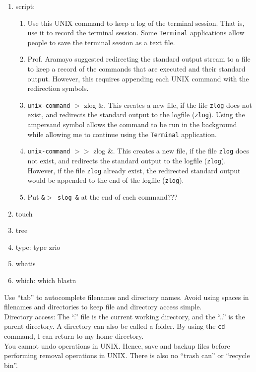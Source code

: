 \begin{enumerate}
\item script: \vspace{-0.3cm}
	\begin{enumerate} \itemsep -2pt
	\item Use this UNIX command to keep a log of the terminal session. That is, use it to record the terminal session. Some {\tt Terminal} applications allow people to save the terminal session as a text file.
	\item Prof. Aramayo suggested redirecting the standard output stream to a file to keep a record of the commands that are executed and their standard output. However, this requires appending each UNIX command with the redirection symbols.
	\item {\tt unix-command} $>$ zlog \&. This creates a new file, if the file {\tt zlog} does not exist, and redirects the standard output to the logfile ({\tt zlog}). Using the ampersand symbol allows the command to be run in the background while allowing me to continue using the {\tt Terminal} application.
	\item {\tt unix-command} $>>$ zlog \&. This creates a new file, if the file {\tt zlog} does not exist, and redirects the standard output to the logfile ({\tt zlog}). However, if the file {\tt zlog} already exist, the redirected standard output would be appended to the end of the logfile ({\tt zlog}).
	\item Put {\tt \&$>$ slog \&} at the end of each command???
	\end{enumerate}
\item touch
\item tree
\item type: type zrio
\item whatis
\item which: which blastn
\end{enumerate}


Use ``tab'' to autocomplete filenames and directory names. Avoid using spaces in filenames and directories to keep file and directory access simple. \\

Directory access: The ``.'' file is the current working directory, and the ``..'' is the parent directory. A directory can also be called a folder. By using the {\tt cd} command, I can return to my home directory. \\

You cannot undo operations in UNIX. Hence, save and backup files before performing removal operations in UNIX. There is also no ``trash can'' or ``recycle bin''. \\

